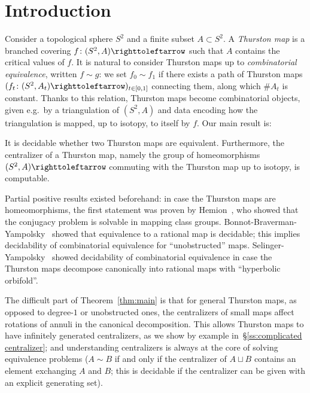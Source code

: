\documentclass{amsart}
\begin{document}
\setcounter{tocdepth}{1}
\tableofcontents

\section{Introduction}
Consider a topological sphere $S^2$ and a finite subset
$A\subset S^2$. A \emph{Thurston map} is a branched covering
$f\colon(S^2,A)\selfmap$ such that $A$ contains the critical values of
$f$. It is natural to consider Thurston maps up to \emph{combinatorial
  equivalence}, written $f\sim g$: we set $f_0\sim f_1$ if there
exists a path of Thurston maps
$(f_t\colon(S^2,A_t)\selfmap)_{t\in[0,1]}$ connecting them, along
which $\#A_t$ is constant. Thanks to this relation, Thurston maps
become combinatorial objects, given e.g.\ by a triangulation of
$(S^2,A)$ and data encoding how the triangulation is mapped, up to
isotopy, to itself by $f$.  Our main result is:
\begin{mainthm}[= Theorem~\ref{thm:A:new}]\label{thm:main}
  It is decidable whether two Thurston maps are
  equivalent. Furthermore, the centralizer of a Thurston map, namely
  the group of homeomorphisms $(S^2,A)\selfmap$ commuting with the
  Thurston map up to isotopy, is computable.
\end{mainthm}
Partial positive results existed beforehand: in case the Thurston maps
are homeomorphisms, the first statement was proven by
Hemion~\cite{hemion:homeos}, who showed that the conjugacy problem is
solvable in mapping class
groups. Bonnot-Braverman-Yampolsky~\cite{bonnot-braverman-yampolsky:thurstondecidable}
showed that equivalence to a rational map is decidable; this implies
decidability of combinatorial equivalence for ``unobstructed''
maps. Selinger-Yampolsky~\cite{selinger-yampolsky:geometrization}
showed decidability of combinatorial equivalence in case the Thurston
maps decompose canonically into rational maps with ``hyperbolic
orbifold''.

The difficult part of Theorem~\ref{thm:main} is that for general
Thurston maps, as opposed to degree-$1$ or unobstructed ones, the
centralizers of small maps affect rotations of annuli in the canonical
decomposition. This allows Thurston maps to have infinitely generated
centralizers, as we show by example in~\S\ref{ss:complicated
  centralizer}; and understanding centralizers is always at the core
of solving equivalence problems ($A\sim B$ if and only if the
centralizer of $A\sqcup B$ contains an element exchanging $A$ and $B$;
this is decidable if the centralizer can be given with an explicit
generating set).
\end{document}
